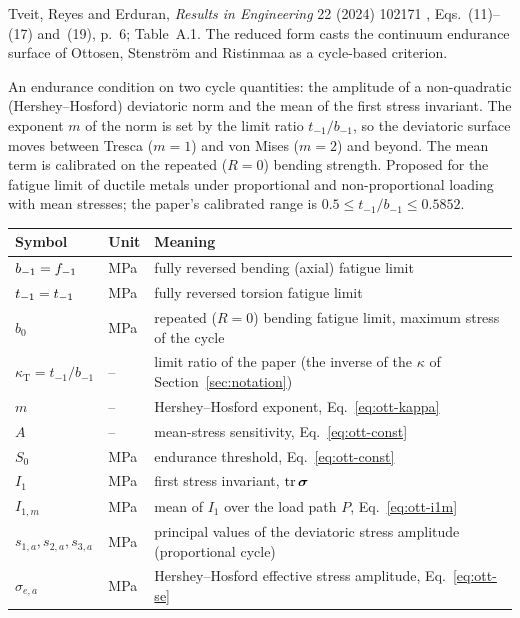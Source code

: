 \label{sheet:OTT}

 Tveit, Reyes and Erduran, \emph{Results in Engineering} 22 (2024) 102171
\cite{tveit2024}, Eqs.~(11)--(17) and~(19), p.~6; Table~A.1. The reduced form casts the continuum
endurance surface of Ottosen, Stenstr\"om and Ristinmaa \cite{ottosen2008} as a cycle-based
criterion.

 An endurance condition on two cycle quantities: the amplitude of a
non-quadratic (Hershey--Hosford) deviatoric norm and the mean of the first stress invariant. The
exponent $m$ of the norm is set by the limit ratio $t_{-1}/b_{-1}$, so the deviatoric surface moves
between Tresca ($m=1$) and von Mises ($m=2$) and beyond. The mean term is calibrated on the repeated
($R=0$) bending strength. Proposed for the fatigue limit of ductile metals under proportional and
non-proportional loading with mean stresses; the paper's calibrated range is
$0.5\le t_{-1}/b_{-1}\le0.5852$.

\begin{center}\small
\begin{tabular}{@{}llp{100mm}@{}}
\toprule
Symbol & Unit & Meaning\\\midrule
$b_{-1}=f_{-1}$ & MPa & fully reversed bending (axial) fatigue limit\\
$t_{-1}=t_{-1}$ & MPa & fully reversed torsion fatigue limit\\
$b_0$ & MPa & repeated ($R=0$) bending fatigue limit, maximum stress of the cycle\\
$\kappa_{\mathrm{T}}=t_{-1}/b_{-1}$ & -- & limit ratio of the paper (the inverse of the $\kappa$ of Section~\ref{sec:notation})\\
$m$ & -- & Hershey--Hosford exponent, Eq.~\eqref{eq:ott-kappa}\\
$A$ & -- & mean-stress sensitivity, Eq.~\eqref{eq:ott-const}\\
$S_0$ & MPa & endurance threshold, Eq.~\eqref{eq:ott-const}\\
$I_1$ & MPa & first stress invariant, $\operatorname{tr}\boldsymbol\sigma$\\
$I_{1,m}$ & MPa & mean of $I_1$ over the load path $P$, Eq.~\eqref{eq:ott-i1m}\\
$s_{1,a},s_{2,a},s_{3,a}$ & MPa & principal values of the deviatoric stress amplitude (proportional cycle)\\
$\sigma_{e,a}$ & MPa & Hershey--Hosford effective stress amplitude, Eq.~\eqref{eq:ott-se}\\
\bottomrule
\end{tabular}
\end{center}


